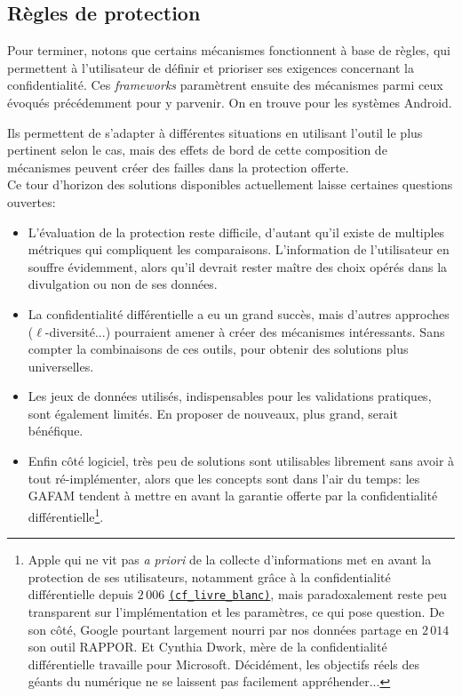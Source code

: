 \documentclass[a4paper,11pt]{article} %
\newcommand{\www}[2]{\href{#1}{\nolinkurl{#2}}}
\begin{document}
\subsection{Règles de protection}
%
Pour terminer, notons que certains mécanismes fonctionnent à base de règles, qui permettent à l'utilisateur de définir et prioriser ses exigences concernant la confidentialité. Ces \emph{frameworks} paramètrent ensuite des mécanismes parmi ceux évoqués précédemment pour y parvenir. On en trouve pour les systèmes Android.

Ils permettent de s'adapter à différentes situations en utilisant l'outil le plus pertinent selon le cas, mais des effets de bord de cette composition de mécanismes peuvent créer des failles dans la protection offerte.\\[-0.4em]

Ce tour d'horizon des solutions disponibles actuellement laisse certaines questions ouvertes:
\begin{itemize}
    \item 
    L'évaluation de la protection reste difficile, d'autant qu'il existe de multiples métriques qui compliquent les comparaisons. L'information de l'utilisateur en souffre évidemment, alors qu'il devrait rester maître des choix opérés dans la divulgation ou non de ses données.
    \item 
    La confidentialité différentielle a eu un grand succès, mais d'autres approches ($\ell$-diversité...) pourraient amener à créer des mécanismes intéressants. Sans compter la combinaisons de ces outils, pour obtenir des solutions plus universelles. 
    \item 
    Les jeux de données utilisés, indispensables pour les validations pratiques, sont également limités. En proposer de nouveaux, plus grand, serait bénéfique.
    \item 
    Enfin côté logiciel, très peu de solutions sont utilisables librement sans avoir à tout ré-implémenter, alors que les concepts sont dans l'air du temps: les GAFAM tendent à mettre en avant la garantie offerte par la confidentialité différentielle\footnote{Apple qui ne vit pas \textit{a priori} de la collecte d'informations met en avant la protection de ses utilisateurs, notamment grâce à la confidentialité différentielle depuis $2\,006$ \www{https://www.apple.com/privacy/docs/Differential_Privacy_Overview.pdf}{(cf\_livre\_blanc)}, mais paradoxalement reste peu transparent sur l'implémentation et les paramètres, ce qui pose question. De son côté, Google pourtant largement nourri par nos données partage en $2\,014$ son outil RAPPOR. Et Cynthia Dwork, \og mère\fg{} de la confidentialité différentielle travaille pour Microsoft. Décidément, les objectifs réels des géants du numérique ne se laissent pas facilement appréhender...}.
\end{itemize}
 
\end{document}
